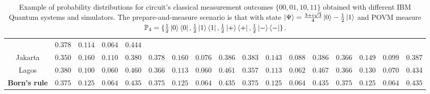 \begin{table}
\begin{tabular}{c|cccc|cccc|cccc|cccc}
                & $\scriptstyle0.378$ & $\scriptstyle0.114$ & $\scriptstyle0.064$ & $\scriptstyle0.444$\\
Jakarta         & $\scriptstyle0.350$ & $\scriptstyle0.160$ & $\scriptstyle0.110$ & $\scriptstyle0.380$ 
                & $\scriptstyle0.378$ & $\scriptstyle0.160$ & $\scriptstyle0.076$ & $\scriptstyle0.386$ 
                & $\scriptstyle0.383$ & $\scriptstyle0.143$ & $\scriptstyle0.088$ & $\scriptstyle0.386$
                & $\scriptstyle0.366$ & $\scriptstyle0.149$ & $\scriptstyle0.099$ & $\scriptstyle0.387$\\   
Lagos           & $\scriptstyle0.380$ & $\scriptstyle0.100$ & $\scriptstyle0.060$ & $\scriptstyle0.460$ 
                & $\scriptstyle0.366$ & $\scriptstyle0.113$ & $\scriptstyle0.060$ & $\scriptstyle0.461$ 
                & $\scriptstyle0.357$ & $\scriptstyle0.113$ & $\scriptstyle0.062$ & $\scriptstyle0.467$
                & $\scriptstyle0.366$ & $\scriptstyle0.130$ & $\scriptstyle0.070$ & $\scriptstyle0.434$\\
\midrule
\textbf{Born's rule}    & $\scriptstyle0.375$ & $\scriptstyle0.125$ & $\scriptstyle0.064$ & $\scriptstyle0.435$ 
                        & $\scriptstyle0.375$ & $\scriptstyle0.125$ & $\scriptstyle0.064$ & $\scriptstyle0.435$ 
                        & $\scriptstyle0.375$ & $\scriptstyle0.125$ & $\scriptstyle0.064$ & $\scriptstyle0.435$ 
                        & $\scriptstyle0.375$ & $\scriptstyle0.125$ & $\scriptstyle0.064$ & $\scriptstyle0.435$ \\
\bottomrule        
\end{tabular}
\caption{Example of probability distributions for circuit's classical measurement outcomes $\{00, 01, 10, 11\}$ obtained with different IBM Quantum systems and simulators. The prepare-and-measure scenario is that with state $\ket{\Psi}=\frac{3 + i \sqrt{3}}{4} \ket{0} - \frac{1}{2} \ket{1}$ and POVM measure $\mathbb{P}_4 = \{\frac{1}{2}\ket{0}\bra{0}, \frac{1}{2}\ket{1}\bra{1}, \frac{1}{2}\ket{+}\bra{+}, \frac{1}{2}\ket{-}\bra{-} \}$.}
\label{table:quantum_results}
\end{table}

